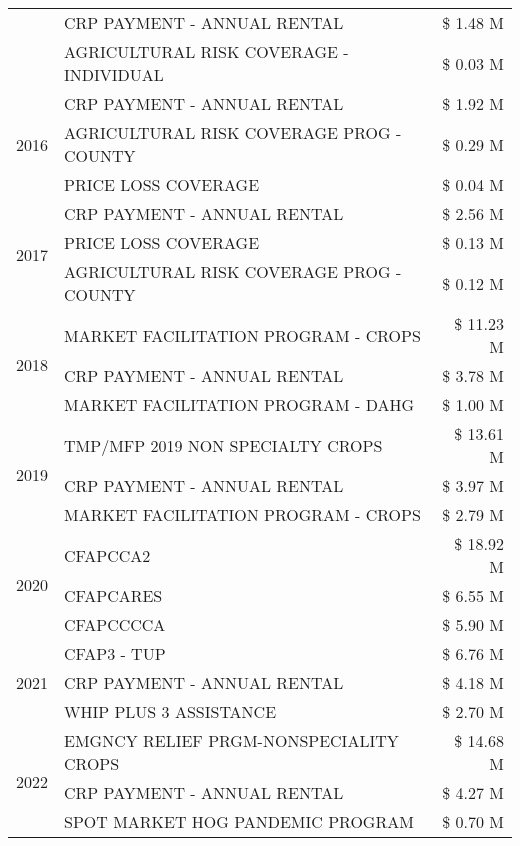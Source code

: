 \begin{tabular}{llr}
 & CRP PAYMENT - ANNUAL RENTAL & \$ 1.48 M \\
 & AGRICULTURAL RISK COVERAGE - INDIVIDUAL & \$ 0.03 M \\
\cline{1-3}
\multirow[t]{3}{*}{2016} & CRP PAYMENT - ANNUAL RENTAL & \$ 1.92 M \\
 & AGRICULTURAL RISK COVERAGE PROG - COUNTY & \$ 0.29 M \\
 & PRICE LOSS COVERAGE & \$ 0.04 M \\
\cline{1-3}
\multirow[t]{3}{*}{2017} & CRP PAYMENT - ANNUAL RENTAL & \$ 2.56 M \\
 & PRICE LOSS COVERAGE & \$ 0.13 M \\
 & AGRICULTURAL RISK COVERAGE PROG - COUNTY & \$ 0.12 M \\
\cline{1-3}
\multirow[t]{3}{*}{2018} & MARKET FACILITATION PROGRAM - CROPS & \$ 11.23 M \\
 & CRP PAYMENT - ANNUAL RENTAL & \$ 3.78 M \\
 & MARKET FACILITATION PROGRAM - DAHG & \$ 1.00 M \\
\cline{1-3}
\multirow[t]{3}{*}{2019} & TMP/MFP 2019 NON SPECIALTY CROPS & \$ 13.61 M \\
 & CRP PAYMENT - ANNUAL RENTAL & \$ 3.97 M \\
 & MARKET FACILITATION PROGRAM - CROPS & \$ 2.79 M \\
\cline{1-3}
\multirow[t]{3}{*}{2020} & CFAPCCA2 & \$ 18.92 M \\
 & CFAPCARES & \$ 6.55 M \\
 & CFAPCCCCA & \$ 5.90 M \\
\cline{1-3}
\multirow[t]{3}{*}{2021} & CFAP3 - TUP & \$ 6.76 M \\
 & CRP PAYMENT - ANNUAL RENTAL & \$ 4.18 M \\
 & WHIP PLUS 3 ASSISTANCE & \$ 2.70 M \\
\cline{1-3}
\multirow[t]{3}{*}{2022} & EMGNCY RELIEF PRGM-NONSPECIALITY CROPS & \$ 14.68 M \\
 & CRP PAYMENT - ANNUAL RENTAL & \$ 4.27 M \\
 & SPOT MARKET HOG PANDEMIC PROGRAM & \$ 0.70 M \\
\cline{1-3}
\bottomrule
\end{tabular}
